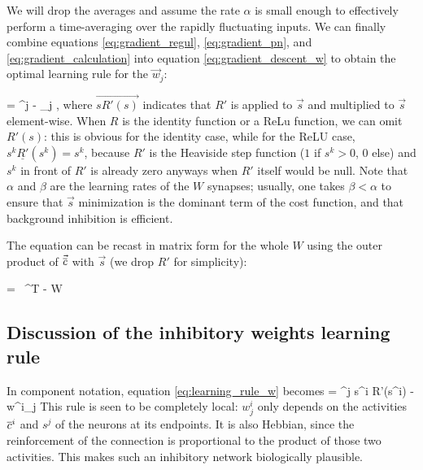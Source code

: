 We will drop the averages and assume the rate $\alpha$ is small enough to effectively perform a time-averaging over the rapidly fluctuating inputs. We can finally combine equations \eqref{eq:gradient_regul}, \eqref{eq:gradient_pn}, and \eqref{eq:gradient_calculation} into equation \eqref{eq:gradient_descent_w} to obtain the optimal learning rule for the $\vec{w}_j$:

\beq
	 = \alpha {}^j  - \beta {}_j \quad ,
	\label{eq:learning_rule_w}
\eeq
where $\overrightarrow{s R'(s)}$ indicates that $R'$ is applied to $\vec{s}$ and multiplied to $\vec{s}$ element-wise. When $R$ is the identity function or a ReLu function, we can omit $R'(s)$: this is obvious for the identity case, while for the ReLU case, $s^k \underline{R'}(s^k) = s^k$, because $R'$ is the Heaviside step function ($1$ if $s^k > 0$, $0$ else) and $s^k$ in front of $R'$ is already zero anyways when $R'$ itself would be null. Note that $\alpha$ and $\beta$ are the learning rates of the $W$ synapses; usually, one takes $\beta < \alpha$ to ensure that $\vec{s}$ minimization is the dominant term of the cost function, and that background inhibition is efficient. 

The equation can be recast in matrix form for the whole $W$ using the outer product of $\vec{\overline{c}}$ with $\vec{s}$ (we drop $R'$ for simplicity):

\beq
	 =  \, ^T - \beta W
	\label{eq:learning_rule_w_matrix}
\eeq

\subsection{Discussion of the inhibitory weights learning rule}
\label{subsect:discussion_w}

In component notation, equation \ref{eq:learning_rule_w} becomes
\beq
	 = \alpha {}^j s^i R'(s^i) - \beta w^i_j \quad 
	\label{eq:learning_rule_w_components}
\eeq
This rule is seen to be completely local: $w^i_j$ only depends on the activities $\overline{c}^i$ and $s^j$ of the neurons at its endpoints. It is also Hebbian, since the reinforcement of the connection is proportional to the product of those two activities. This makes such an inhibitory network biologically plausible. 

